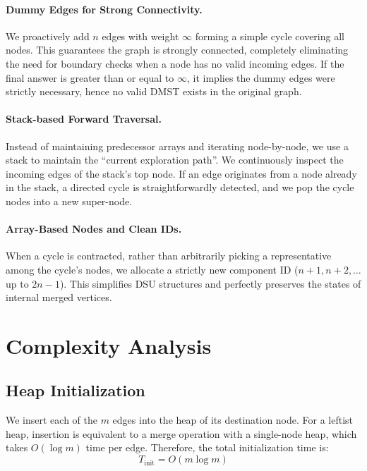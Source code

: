 \documentclass[UTF8, a4paper]{article}
\theoremstyle{definition}
\begin{document}
\paragraph{Dummy Edges for Strong Connectivity.} 
We proactively add $n$ edges with weight $\infty$ forming a simple cycle covering all nodes. This guarantees the graph is strongly connected, completely eliminating the need for boundary checks when a node has no valid incoming edges. If the final answer is greater than or equal to $\infty$, it implies the dummy edges were strictly necessary, hence no valid DMST exists in the original graph.

\paragraph{Stack-based Forward Traversal.}
Instead of maintaining predecessor arrays and iterating node-by-node, we use a stack to maintain the ``current exploration path''. We continuously inspect the incoming edges of the stack's top node. If an edge originates from a node already in the stack, a directed cycle is straightforwardly detected, and we pop the cycle nodes into a new super-node.

\paragraph{Array-Based Nodes and Clean IDs.}
When a cycle is contracted, rather than arbitrarily picking a representative among the cycle's nodes, we allocate a strictly new component ID ($n+1, n+2, \dots$ up to $2n-1$). This simplifies DSU structures and perfectly preserves the states of internal merged vertices.

\section{Complexity Analysis}

\subsection{Heap Initialization}

We insert each of the $m$ edges into the heap of its destination node. For a leftist heap, insertion is equivalent to a merge operation with a single-node heap, which takes $O(\log m)$ time per edge. Therefore, the total initialization time is:
\[
T_{\text{init}} = O(m \log m)
\]
\end{document}
